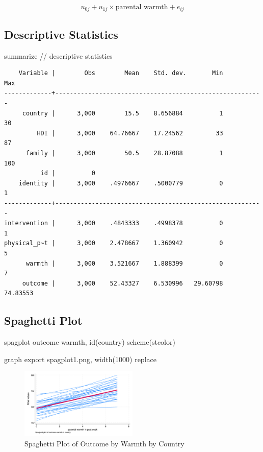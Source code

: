 \documentclass[
  letterpaper,
  DIV=11,
  numbers=noendperiod]{scrreprt}
\newenvironment{Shaded}{\begin{snugshade}}{\end{snugshade}}
\newcommand{\CommentTok}[1]{\textcolor[rgb]{0.37,0.37,0.37}{#1}}
\newcommand{\DecValTok}[1]{\textcolor[rgb]{0.68,0.00,0.00}{#1}}
\newcommand{\KeywordTok}[1]{\textcolor[rgb]{0.00,0.23,0.31}{#1}}
\newcommand{\NormalTok}[1]{\textcolor[rgb]{0.00,0.23,0.31}{#1}}
\begin{document}
\[u_{0j} + u_{1j} \times \text{parental warmth} + e_{ij} \]

\subsection{Descriptive Statistics}\label{descriptive-statistics}

\begin{Shaded}
\begin{Highlighting}[]

\KeywordTok{summarize} \CommentTok{// descriptive statistics}
\end{Highlighting}
\end{Shaded}

\begin{verbatim}
    Variable |        Obs        Mean    Std. dev.       Min        Max
-------------+---------------------------------------------------------
     country |      3,000        15.5    8.656884          1         30
         HDI |      3,000    64.76667    17.24562         33         87
      family |      3,000        50.5    28.87088          1        100
          id |          0
    identity |      3,000    .4976667    .5000779          0          1
-------------+---------------------------------------------------------
intervention |      3,000    .4843333    .4998378          0          1
physical_p~t |      3,000    2.478667    1.360942          0          5
      warmth |      3,000    3.521667    1.888399          0          7
     outcome |      3,000    52.43327    6.530996   29.60798   74.83553
\end{verbatim}

\subsection{Spaghetti Plot}\label{spaghetti-plot}

\begin{Shaded}
\begin{Highlighting}[]
\NormalTok{spagplot outcome warmth, id(country) }\DecValTok{scheme}\NormalTok{(stcolor)}

\KeywordTok{graph} \KeywordTok{export}\NormalTok{ spagplot1.png, }\KeywordTok{width}\NormalTok{(1000) }\KeywordTok{replace}
\end{Highlighting}
\end{Shaded}

\begin{figure}[H]

{\centering \includegraphics[width=0.5\textwidth,height=\textheight]{spagplot1.png}

}

\caption{Spaghetti Plot of Outcome by Warmth by Country}

\end{figure}%
\end{document}
